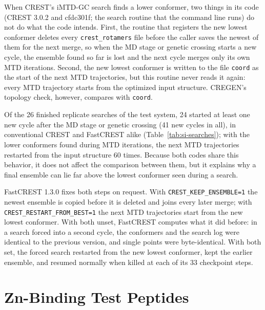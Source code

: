 \documentclass[journal=jctcce,manuscript=suppinfo]{achemso}
\begin{document}
When CREST's iMTD-GC search finds a lower conformer, two things in its code (CREST 3.0.2 and cfdc301f; the search
routine that the command line runs) do not do what the code intends. First, the routine that registers the new lowest
conformer deletes every \texttt{crest\_rotamers} file before the caller saves the newest of them for the next merge, so
when the MD stage or genetic crossing starts a new cycle, the ensemble found so far is lost and the next cycle merges
only its own MTD iterations. Second, the new lowest conformer is written to the file \texttt{coord} as the start of the
next MTD trajectories, but this routine never reads it again: every MTD trajectory starts from the optimized input structure. CREGEN's
topology check, however, compares with \texttt{coord}.

Of the 26 finished replicate searches of the test system, 24 started at least one new cycle after the MD stage or genetic
crossing (41 new cycles in all), in conventional CREST and FastCREST alike (Table~\ref{tab:si-searches}); with the lower conformers found during MTD iterations, the next MTD trajectories restarted from the input structure 60 times. Because both codes share
this behavior, it does not affect the comparison between them, but it explains why a final ensemble can lie far above
the lowest conformer seen during a search.

{\sloppy FastCREST 1.3.0 fixes both steps on request. With \texttt{CREST\_KEEP\_ENSEMBLE=1} the newest ensemble is copied before
it is deleted and joins every later merge; with \texttt{CREST\_RESTART\_FROM\_BEST=1} the next MTD trajectories start from
the new lowest conformer. With both unset, FastCREST computes what it did before: in a search forced into a second cycle,
the conformers and the search log were identical to the previous version, and single points were byte-identical. With
both set, the forced search restarted from the new lowest conformer, kept the earlier ensemble, and resumed normally when killed at each of its 33 checkpoint steps.\par}

\section{Zn-Binding Test Peptides}
\label{si:metal}
\end{document}
